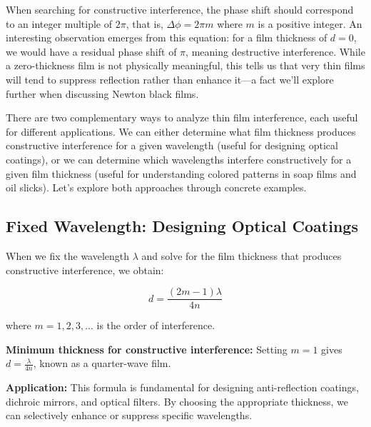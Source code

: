 \documentclass[
  a4paper,
]{book}
\begin{document}
When searching for constructive interference, the phase shift should
correspond to an integer multiple of \(2\pi\), that is,
\(\Delta \phi = 2\pi m\) where \(m\) is a positive integer. An
interesting observation emerges from this equation: for a film thickness
of \(d = 0\), we would have a residual phase shift of \(\pi\), meaning
destructive interference. While a zero-thickness film is not physically
meaningful, this tells us that very thin films will tend to suppress
reflection rather than enhance it---a fact we'll explore further when
discussing Newton black films.

There are two complementary ways to analyze thin film interference, each
useful for different applications. We can either determine what film
thickness produces constructive interference for a given wavelength
(useful for designing optical coatings), or we can determine which
wavelengths interfere constructively for a given film thickness (useful
for understanding colored patterns in soap films and oil slicks). Let's
explore both approaches through concrete examples.

\subsection{Fixed Wavelength: Designing Optical
Coatings}\label{fixed-wavelength-designing-optical-coatings}

When we fix the wavelength \(\lambda\) and solve for the film thickness
that produces constructive interference, we obtain:

\begin{tcolorbox}[enhanced jigsaw, breakable, toptitle=1mm, bottomrule=.15mm, colbacktitle=quarto-callout-important-color!10!white, title=\textcolor{quarto-callout-important-color}{\faExclamation}\hspace{0.5em}{Thickness for Constructive Interference}, arc=.35mm, rightrule=.15mm, bottomtitle=1mm, opacityback=0, toprule=.15mm, coltitle=black, leftrule=.75mm, opacitybacktitle=0.6, colback=white, left=2mm, titlerule=0mm, colframe=quarto-callout-important-color-frame]

\[d=\frac{(2m-1)\lambda}{4n}\]

where \(m = 1, 2, 3, ...\) is the order of interference.

\textbf{Minimum thickness for constructive interference:} Setting
\(m = 1\) gives \(d = \frac{\lambda}{4n}\), known as a quarter-wave
film.

\textbf{Application:} This formula is fundamental for designing
anti-reflection coatings, dichroic mirrors, and optical filters. By
choosing the appropriate thickness, we can selectively enhance or
suppress specific wavelengths.

\end{tcolorbox}
\end{document}
